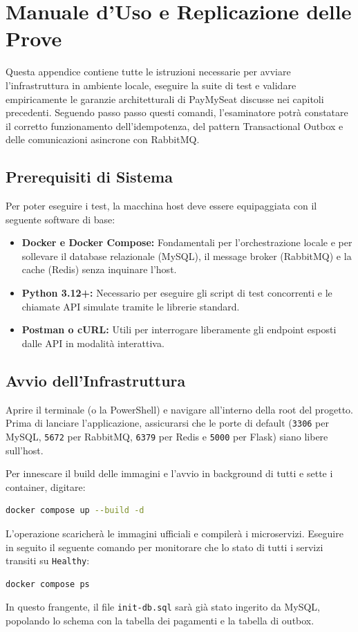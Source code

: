 \documentclass[11pt,a4paper]{report}
\begin{document}
\chapter{Manuale d'Uso e Replicazione delle Prove}

Questa appendice contiene tutte le istruzioni necessarie per avviare l'infrastruttura in ambiente locale, eseguire la suite di test e validare empiricamente le garanzie architetturali di PayMySeat discusse nei capitoli precedenti. Seguendo passo passo questi comandi, l'esaminatore potr\`a constatare il corretto funzionamento dell'idempotenza, del pattern Transactional Outbox e delle comunicazioni asincrone con RabbitMQ.

\section{Prerequisiti di Sistema}
Per poter eseguire i test, la macchina host deve essere equipaggiata con il seguente software di base:
\begin{itemize}
    \item \textbf{Docker e Docker Compose:} Fondamentali per l'orchestrazione locale e per sollevare il database relazionale (MySQL), il message broker (RabbitMQ) e la cache (Redis) senza inquinare l'host.
    \item \textbf{Python 3.12+:} Necessario per eseguire gli script di test concorrenti e le chiamate API simulate tramite le librerie standard.
    \item \textbf{Postman o cURL:} Utili per interrogare liberamente gli endpoint esposti dalle API in modalit\`a interattiva.
\end{itemize}

\section{Avvio dell'Infrastruttura}
Aprire il terminale (o la PowerShell) e navigare all'interno della root del progetto. Prima di lanciare l'applicazione, assicurarsi che le porte di default (\texttt{3306} per MySQL, \texttt{5672} per RabbitMQ, \texttt{6379} per Redis e \texttt{5000} per Flask) siano libere sull'host.

Per innescare il build delle immagini e l'avvio in background di tutti e sette i container, digitare:
\begin{lstlisting}[language=bash]
docker compose up --build -d
\end{lstlisting}

L'operazione scaricher\`a le immagini ufficiali e compiler\`a i microservizi. Eseguire in seguito il seguente comando per monitorare che lo stato di tutti i servizi transiti su \texttt{Healthy}:
\begin{lstlisting}[language=bash]
docker compose ps
\end{lstlisting}
In questo frangente, il file \texttt{init-db.sql} sar\`a gi\`a stato ingerito da MySQL, popolando lo schema con la tabella dei pagamenti e la tabella di outbox.
\end{document}
